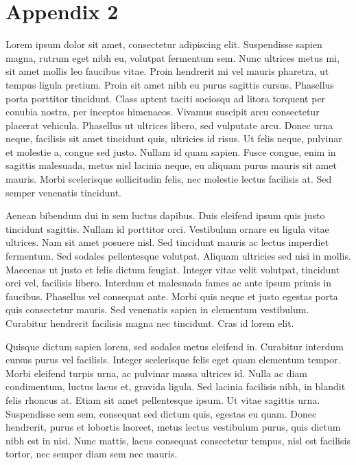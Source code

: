 \chapter{Appendix 2}\label{ch:appendix02}

Lorem ipsum dolor sit amet, consectetur adipiscing elit. Suspendisse sapien magna, rutrum eget nibh eu, volutpat fermentum sem. Nunc ultrices metus mi, sit amet mollis leo faucibus vitae. Proin hendrerit mi vel mauris pharetra, ut tempus ligula pretium. Proin sit amet nibh eu purus sagittis cursus. Phasellus porta porttitor tincidunt. Class aptent taciti sociosqu ad litora torquent per conubia nostra, per inceptos himenaeos. Vivamus suscipit arcu consectetur placerat vehicula. Phasellus ut ultrices libero, sed vulputate arcu. Donec urna neque, facilisis sit amet tincidunt quis, ultricies id risus. Ut felis neque, pulvinar et molestie a, congue sed justo. Nullam id quam sapien. Fusce congue, enim in sagittis malesuada, metus nisl lacinia neque, eu aliquam purus mauris sit amet mauris. Morbi scelerisque sollicitudin felis, nec molestie lectus facilisis at. Sed semper venenatis tincidunt.


Aenean bibendum dui in sem luctus dapibus. Duis eleifend ipsum quis justo tincidunt sagittis. Nullam id porttitor orci. Vestibulum ornare eu ligula vitae ultrices. Nam sit amet posuere nisl. Sed tincidunt mauris ac lectus imperdiet fermentum. Sed sodales pellentesque volutpat. Aliquam ultricies sed nisi in mollis. Maecenas ut justo et felis dictum feugiat. Integer vitae velit volutpat, tincidunt orci vel, facilisis libero. Interdum et malesuada fames ac ante ipsum primis in faucibus. Phasellus vel consequat ante. Morbi quis neque et justo egestas porta quis consectetur mauris. Sed venenatis sapien in elementum vestibulum. Curabitur hendrerit facilisis magna nec tincidunt. Cras id lorem elit.


Quisque dictum sapien lorem, sed sodales metus eleifend in. Curabitur interdum cursus purus vel facilisis. Integer scelerisque felis eget quam elementum tempor. Morbi eleifend turpis urna, ac pulvinar massa ultrices id. Nulla ac diam condimentum, luctus lacus et, gravida ligula. Sed lacinia facilisis nibh, in blandit felis rhoncus at. Etiam sit amet pellentesque ipsum. Ut vitae sagittis urna. Suspendisse sem sem, consequat sed dictum quis, egestas eu quam. Donec hendrerit, purus et lobortis laoreet, metus lectus vestibulum purus, quis dictum nibh est in nisi. Nunc mattis, lacus consequat consectetur tempus, nisl est facilisis tortor, nec semper diam sem nec mauris.


